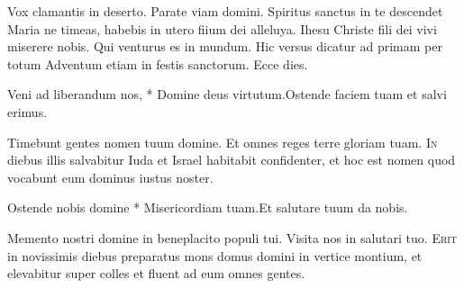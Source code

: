 \begin{multicols*}{2}
\newline \V Vox clamantis in deserto.
\newline \R Parate viam domini.
 Spiritus sanctus in te descendet Maria ne timeas, habebis in utero fiium dei alleluya.
 \R Ihesu Christe fili dei vivi miserere nobis. \V Qui venturus es in mundum. Hic versus dicatur ad primam per totum Adventum etiam in festis sanctorum.
 Ecce dies.
\begin{responsory-breve}
{Veni ad liberandum nos, * Domine deus virtutum.}{Ostende faciem tuam et salvi erimus.}
\end{responsory-breve}
\V Timebunt gentes nomen tuum domine. \R Et omnes reges terre gloriam tuam.
\lettrine[lines=2]{\zallmancaps \color{Red} I}{n} diebus illis salvabitur Iuda et Israel habitabit confidenter, et hoc est nomen quod vocabunt eum dominus iustus noster.
\begin{responsory-breve}
{Ostende nobis domine * Misericordiam tuam.}{Et salutare tuum da nobis.}
\end{responsory-breve}
\V Memento nostri domine in beneplacito populi tui. \R Visita nos in salutari tuo.
\lettrine[lines=2]{\zallmancaps \color{Blue} E}{rit} in novissimis diebus preparatus mons domus domini in vertice montium, et elevabitur super colles et fluent ad eum omnes gentes.

\end{multicols*}
